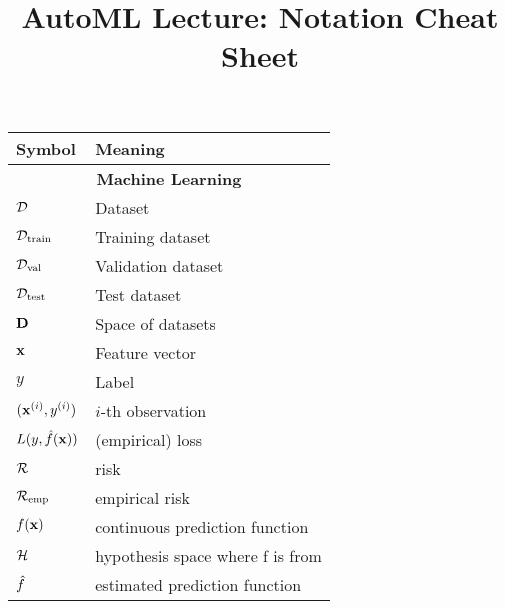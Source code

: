 \documentclass[]{report}
\title{AutoML Lecture: Notation Cheat Sheet}
\author{}
\date{}
\begin{document}
\maketitle

\begin{table}
	\begin{tabular}{ll}
		\toprule
		Symbol & Meaning \\
		\midrule
		\multicolumn{2}{c}{\textbf{Machine Learning}}\\
     	$\mathcal{D}$ & Dataset\\
     	$\mathcal{D}_{\text{train}}$ & Training dataset\\
	   	$\mathcal{D}_{\text{val}}$ & Validation dataset\\
     	$\mathcal{D}_{\text{test}}$ & Test dataset\\
		$\mathbf{D}$ & Space of datasets\\
     	$\mathbf{x}$ & Feature vector \\
     	$y$ & Label \\
     	$(\mathbf{x}^{(i)},y^{(i)})$ & $i$-th observation\\
		$L(y,\hat{f}(\mathbf{x}))$ & (empirical) loss\\
		$\mathcal{R}$ & risk\\
		$\mathcal{R}_{\text{emp}}$ & empirical risk\\
		$f(\mathbf{x})$ & continuous prediction function \\
		$\mathcal{H}$ & hypothesis space where f is from \\
		$\hat{f}$ & estimated prediction function \\


\end{tabular}
\end{table}
\end{document}
